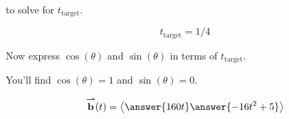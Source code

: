 \documentclass{ximera}
\begin{document}
\begin{exercise}
\begin{hint}
\[    \]
    to solve for $t_{\text{target}}$.
  \end{hint}
  \begin{hint}
    \[
    t_{\text{target}} = 1/4
    \]
  \end{hint}
  \begin{hint}
    Now express $\cos(\theta)$ and $\sin(\theta)$ in terms of
    $t_{\text{target}}$.
  \end{hint}
  \begin{hint}
    You'll find $\cos(\theta) = 1$ and $\sin(\theta) = 0$.
  \end{hint}
  \begin{prompt}
    \[
    \vec{b}(t) = \vector{
      \answer{160t}
      \answer{-16t^2+5}
       }
    \]
  \end{prompt}
\end{exercise}
\end{document}
